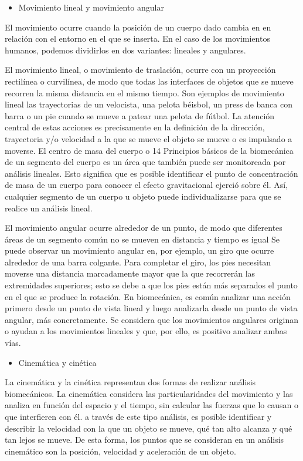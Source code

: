 \documentclass{article}
\begin{document}
\begin{itemize}
\item Movimiento lineal y movimiento angular
\end{itemize} 

El movimiento ocurre cuando la posición de un cuerpo dado cambia en en relación con el entorno en el que se inserta. En el caso de los movimientos humanos, podemos dividirlos en dos variantes: lineales y angulares.

El movimiento lineal, o movimiento de traslación, ocurre con un proyección rectilínea o curvilínea, de modo que todas las interfaces de objetos que se mueve recorren la misma distancia en el mismo tiempo. Son ejemplos de movimiento lineal las trayectorias de un velocista, una pelota béisbol, un press de banca con barra o un pie cuando se mueve a patear una pelota de fútbol. La atención central de estas acciones es precisamente en la definición de la dirección, trayectoria y/o velocidad a la que se mueve el objeto se mueve o es impulsado a moverse. El centro de masa del cuerpo o 14 Principios básicos de la biomecánica de un segmento del cuerpo es un área que también puede ser monitoreada por análisis lineales. Esto significa que es posible identificar el punto de concentración de masa de un cuerpo para conocer el efecto gravitacional ejerció sobre él. Así, cualquier segmento de un cuerpo u objeto puede individualizarse para que se realice un análisis lineal.

El movimiento angular ocurre alrededor de un punto, de modo que diferentes áreas de un segmento común no se mueven en distancia y tiempo es igual Se puede observar un movimiento angular en, por ejemplo, un giro que ocurre alrededor de una barra colgante. Para completar el giro, los pies necesitan moverse una distancia marcadamente mayor que la que recorrerán las extremidades superiores; esto se debe a que los pies están más separados el punto en el que se produce la rotación. En biomecánica, es común analizar una acción primero desde un punto de vista lineal y luego analizarla desde un punto de vista angular, más concretamente. Se considera que los movimientos angulares originan o ayudan a los movimientos lineales y que, por ello, es positivo analizar ambas vías. \cite{ff6}
\begin{itemize}
\item Cinemática y cinética
\end{itemize} 

La cinemática y la cinética representan dos formas de realizar análisis biomecánicos. La cinemática considera las particularidades del movimiento y las analiza en función del espacio y el tiempo, sin calcular las fuerzas que lo causan o que interfieren con él. a través de este tipo análisis, es posible identificar y describir la velocidad con la que un objeto se mueve, qué tan alto alcanza y qué tan lejos se mueve. De esta forma, los puntos que se consideran en un análisis cinemático son la posición, velocidad y aceleración de un objeto.
\end{document}
